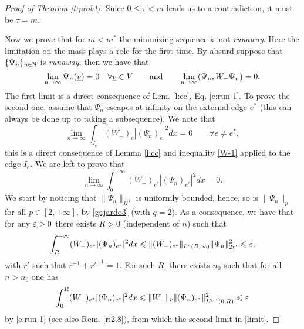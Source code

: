 {\begin{proof}[Proof of Theorem \ref{t:prob1}]
Since  $0\leq\tau<m$ leads us to a contradiction, it must be $\tau=m$. 

Now we prove that for $m<m^\ast$ the minimizing sequence is not {\em runaway}. Here the limitation on the mass plays a role for the first time.
By absurd suppose that $\{\Psi_n\}_{n\in\mathbb N} $ is {\em runaway}, then we have that 
\begin{equation}\label{limit}
\lim_{n\to\infty} \Psi_{n} (\underline{v}) =0\quad \forall \underline{v}\in V\qquad \text{and}\qquad \lim_{n\to\infty}(\Psi_n, W_- \Psi_n)= 0.
\end{equation} The first limit  is a direct consequence of Lem. \ref{l:cc}, Eq. \eqref{e:run-1}. To prove the second one, assume that $\Psi_n$ escapes at infinity on the external  edge $e^*$ (this can always be done up to taking a subsequence). We note that
\begin{equation*}
\lim_{n\to\infty}\int_{I_e} (W_-)_e |(\Psi_n)_e|^2 dx = 0 \qquad \forall e \neq e^* ,
\end{equation*}
this is a  direct consequence of Lemma \ref{l:cc} and inequality  \eqref{W-1} applied to the edge $I_e$. We are left to prove that 
\begin{equation}\label{holiday}
\lim_{n\to \infty}\int_{0}^{+\infty} (W_-)_{e^*} |(\Psi_n)_{e^*}|^2 dx = 0 . 
\end{equation}
 We start by noticing that  $\|\Psi_n\|_{H^1}$ is uniformly bounded, hence, so is $\|\Psi_n\|_p$ for all $p\in [2,+\infty]$, by \eqref{gajardo3} (with $q=2$). As a consequence, we have that  for any $\varepsilon>0$ there exists $R>0$ (independent of $n$) such that
 \begin{equation*}
\int_{R}^{+\infty} (W_-)_{e^*} |(\Psi_n)_{e^*}|^2 dx \leqslant \|(W_-)_{e^*}\|_{L^r(R,\infty)} \|\Psi_n\|_{2r'}^2 \leqslant \varepsilon,
\end{equation*}
with $r'$ such that $r^{-1}+{r'}^{-1} =1 $.  For such $R$, there exists $n_0$ such that for all $n>n_0$ one has 
\begin{equation*}
\int_{0}^{R} (W_-)_{e^*} |(\Psi_n)_{e^*}|^2 dx \leqslant  \|W_-\|_r \|(\Psi_n)_{e^*}\|_{L^{2r'}(0,R)}^2 \leqslant \varepsilon  
\end{equation*}
by \eqref{e:run-1} (see also Rem. \ref{r:2.8}), from which the second limit in \eqref{limit}. 


\end{proof}}
